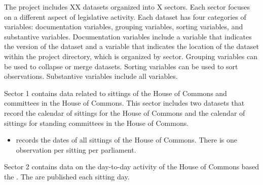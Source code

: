 \newpage


The project includes XX datasets organized into X sectors. Each sector focuses on a different aspect of legislative activity. Each dataset has four categories of variables: documentation variables, grouping variables, sorting variables, and substantive variables. Documentation variables include a variable that indicates the version of the dataset and a variable that indicates the location of the dataset within the project directory, which is organized by sector. Grouping variables can be used to collapse or merge datasets. Sorting variables can be used to sort observations. Substantive variables include all variables.


Sector 1 contains data related to sittings of the House of Commons and committees in the House of Commons. This sector includes two datasets that record the calendar of sittings for the House of Commons and the calendar of sittings for standing committees in the House of Commons. 

\begin{itemize}
	
	\item {} records the dates of all sittings of the House of Commons. There is one observation per sitting per parliament.
	
	
\end{itemize}

\myline


Sector 2 contains data on the day-to-day activity of the House of Commons based the %
. The  %
are published each sitting day. %

